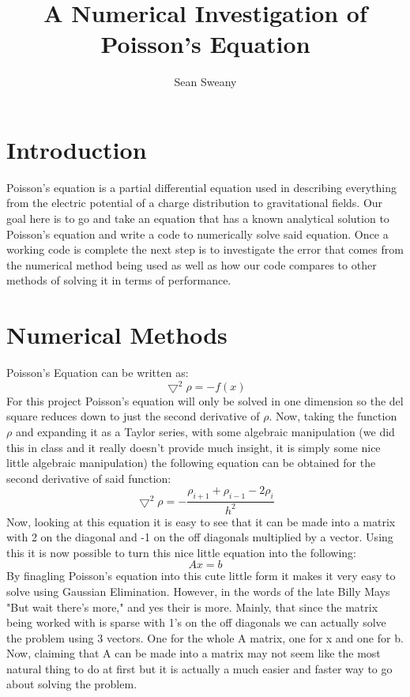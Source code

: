 \documentclass[12pt,righttag]{article}
\begin{document}
	\title{A Numerical Investigation of Poisson's Equation}
	\author{Sean Sweany}
	\renewcommand{\today}{February 12, 2016}
	\maketitle
	
	\section{Introduction}
	Poisson's equation is a partial differential equation used in describing everything from the electric potential of a charge distribution to gravitational fields. Our goal here is to go and take an equation that has a known analytical solution to Poisson's equation and write a code to numerically solve said equation. Once a working code is complete the next step is to investigate the error that comes from the numerical method being used as well as how our code compares to other methods of solving it in terms of performance.
	
	\section{Numerical Methods}
	Poisson's Equation can be written as:
	\[\bigtriangledown^2\rho=-f(x)\]
	For this project Poisson's equation will only be solved in one dimension so the del square reduces down to just the second derivative of $\rho$. Now, taking the function $\rho$ and expanding it as a Taylor series, with some algebraic manipulation (we did this in class and it really doesn't provide much insight, it is simply some nice little algebraic manipulation) the following equation can be obtained for the second derivative of said function:
	\[\bigtriangledown^2\rho=-\frac{\rho_{i+1}+\rho_{i-1}-2\rho_i}{h^2}\]
	Now, looking at this equation it is easy to see that it can be made into a matrix with 2 on the diagonal and -1 on the off diagonals multiplied by a vector. Using this it is now possible to turn this nice little equation into the following:
	\[Ax=b\]
	By finagling Poisson's equation into this cute little form it makes it very easy to solve using Gaussian Elimination. However, in the words of the late Billy Mays "But wait there's more," and yes their is more. Mainly, that since the matrix being worked with is sparse with 1's on the off diagonals we can actually solve the problem using 3 vectors. One for the whole A matrix, one for x and one for b. Now, claiming that A can be made into a matrix may not seem like the most natural thing to do at first but it is actually a much easier and faster way to go about solving the problem.
	
\end{document}
